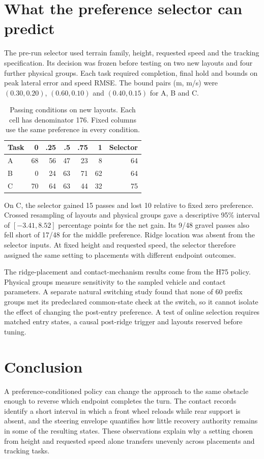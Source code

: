 \documentclass[journal]{IEEEtran}
\begin{document}
\section{What the preference selector can predict}
The pre-run selector used terrain family, height, requested speed and the tracking specification. Its decision was frozen before testing on two new layouts and four further physical groups. Each task required completion, final hold and bounds on peak lateral error and speed RMSE. The bound pairs (m, m/s) were $(0.30,0.20)$, $(0.60,0.10)$ and $(0.40,0.15)$ for A, B and C.

\begin{table}[t]\centering
\caption{Passing conditions on new layouts. Each cell has denominator 176. Fixed columns use the same preference in every condition.}
\begin{tabular}{lrrrrrr}\toprule
Task & 0 & .25 & .5 & .75 & 1 & Selector\\\midrule
A & 68 & 56 & 47 & 23 & 8 & 64\\
B & 0 & 24 & 63 & 71 & 62 & 64\\
C & 70 & 64 & 63 & 44 & 32 & 75\\\bottomrule
\end{tabular}\end{table}
On C, the selector gained 15 passes and lost 10 relative to fixed zero preference. Crossed resampling of layouts and physical groups gave a descriptive 95\% interval of $[-3.41,8.52]$ percentage points for the net gain. Its 9/48 gravel passes also fell short of 17/48 for the middle preference. Ridge location was absent from the selector inputs. At fixed height and requested speed, the selector therefore assigned the same setting to placements with different endpoint outcomes.

The ridge-placement and contact-mechanism results come from the H75 policy. Physical groups measure sensitivity to the sampled vehicle and contact parameters. A separate natural switching study found that none of 60 prefix groups met its predeclared common-state check at the switch, so it cannot isolate the effect of changing the post-entry preference. A test of online selection requires matched entry states, a causal post-ridge trigger and layouts reserved before tuning.

\section{Conclusion}
A preference-conditioned policy can change the approach to the same obstacle enough to reverse which endpoint completes the turn. The contact records identify a short interval in which a front wheel reloads while rear support is absent, and the steering envelope quantifies how little recovery authority remains in some of the resulting states. These observations explain why a setting chosen from height and requested speed alone transfers unevenly across placements and tracking tasks.

\end{document}
